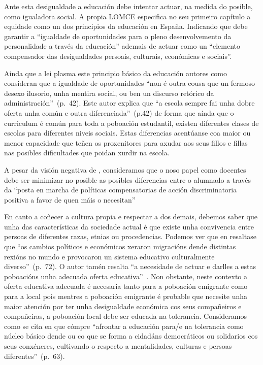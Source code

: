 Ante esta desigualdade a educación debe intentar actuar, na medida do posible, como igualadora social. A propia LOMCE especifica no seu primeiro capítulo a equidade como un dos principios da educación en España. Indicando que debe garantir a ``igualdade de oportunidades para o pleno desenvolvemento da personalidade a través da educación'' ademais de actuar como un ``elemento compensador das desigualdades persoais, culturais, económicas e sociais''.

Aínda que a lei plasma este principio básico da educación autores como  consideran que a igualdade de oportunidades ``non é outra cousa que un fermoso desexo ilusorio, unha mentira social, ou ben un discurso retórico da administración''~(p.~42). Este autor explica que ``a escola sempre fai unha dobre oferta unha común e outra diferenciada''~(p.42) de forma que aínda que o curriculum é común para toda a poboación estudantil, existen diferentes clases de escolas para diferentes niveis sociais. Estas diferencias acentúanse coa maior ou menor capacidade que teñen os proxenitores para axudar aos seus fillos e fillas nas posibles dificultades que poidan xurdir na escola.

A pesar da visión negativa de \citeauthor{funcionessocieles}, consideramos que o noso papel como docentes debe ser minimizar no posible as posibles diferencias entre o alumnado a través da ``posta en marcha de políticas compensatorias de acción discriminatoria positiva a favor de quen máis o necesitan''~\cite[p.~17]{sacristan2000educacion}

En canto a coñecer a cultura propia e respectar a dos demais, debemos saber que unha das características da sociedade actual é que existe unha convivencia entre persoas de diferentes razas, etnias ou procedencias. Podemos ver que en  resaltase que ``os cambios políticos e económicos xeraron migracións dende distintas rexións no mundo e provocaron un sistema educativo culturalmente diverso''~(p.~72). O autor tamén resalta ``a necesidade de actuar e darlles a estas poboacións unha adecuada oferta educativa''~\cite[p.~72]{rivera2014practica}. Non obstante, neste contexto a oferta educativa adecuada é necesaria tanto para a poboación emigrante como para a local pois mentres a poboación emigrante é probable que necesite unha maior atención por ter unha desigualdade económica cos seus compañeiros e compañeiras, a poboación local debe ser educada na tolerancia. Consideramos como se cita en   que cómpre ``afrontar a educación para/e na tolerancia como núcleo básico dende ou co que se forma a cidadáns democráticos ou solidarios cos seus conxéneres, cultivando o respecto a mentalidades, culturas e persoas diferentes''~(p.~63).

